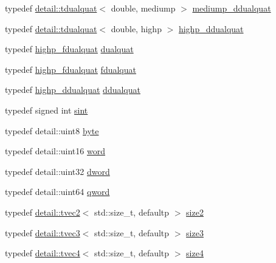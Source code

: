 \begin{DoxyCompactItemize}
\item 
typedef \hyperlink{structglm_1_1detail_1_1tdualquat}{detail\+::tdualquat}$<$ double, mediump $>$ \hyperlink{group__gtc__dual__quaternion_ga62d8cbf30e2afd0b1044204268a69066}{mediump\+\_\+ddualquat}
\item 
typedef \hyperlink{structglm_1_1detail_1_1tdualquat}{detail\+::tdualquat}$<$ double, highp $>$ \hyperlink{group__gtc__dual__quaternion_ga61b654c21f080135aedcf23461eb1037}{highp\+\_\+ddualquat}
\item 
typedef \hyperlink{group__gtc__dual__quaternion_ga2ed3283c09d3ffaf52a0e0a4b248eab6}{highp\+\_\+fdualquat} \hyperlink{group__gtc__dual__quaternion_ga2f6227b5f9dc08a2e7682065a84b3aa9}{dualquat}
\item 
typedef \hyperlink{group__gtc__dual__quaternion_ga2ed3283c09d3ffaf52a0e0a4b248eab6}{highp\+\_\+fdualquat} \hyperlink{group__gtc__dual__quaternion_ga436906129bc69ca5059555cafcbac9fd}{fdualquat}
\item 
typedef \hyperlink{group__gtc__dual__quaternion_ga61b654c21f080135aedcf23461eb1037}{highp\+\_\+ddualquat} \hyperlink{group__gtc__dual__quaternion_ga373431ffdd82d5c03c258217a9e1f1a6}{ddualquat}
\item 
typedef signed int \hyperlink{group__gtx__integer_ga73643e09d8c6d362418aec541fdb987d}{sint}
\item 
typedef detail\+::uint8 \hyperlink{group__gtx__raw__data_gacd7fe1f2ad60a57f7d7ad4f1e6836efd}{byte}
\item 
typedef detail\+::uint16 \hyperlink{group__gtx__raw__data_ga5617a479d471021b5c773c5e969ba46d}{word}
\item 
typedef detail\+::uint32 \hyperlink{group__gtx__raw__data_ga1fc2589df6d44e923cd1820cf14805cf}{dword}
\item 
typedef detail\+::uint64 \hyperlink{group__gtx__raw__data_ga32447af289e879589883c9b7e3be1246}{qword}
\item 
typedef \hyperlink{structglm_1_1detail_1_1tvec2}{detail\+::tvec2}$<$ std\+::size\+\_\+t, defaultp $>$ \hyperlink{group__gtx__std__based__type_ga393e8beba20ea33452384087a2864f86}{size2}
\item 
typedef \hyperlink{structglm_1_1detail_1_1tvec3}{detail\+::tvec3}$<$ std\+::size\+\_\+t, defaultp $>$ \hyperlink{group__gtx__std__based__type_gae1dda4cdccd4c1abeeb2e470c048d0c9}{size3}
\item 
typedef \hyperlink{structglm_1_1detail_1_1tvec4}{detail\+::tvec4}$<$ std\+::size\+\_\+t, defaultp $>$ \hyperlink{group__gtx__std__based__type_gac04a40cfe44b5035770cf26d98a9349d}{size4}

\end{DoxyCompactItemize}
